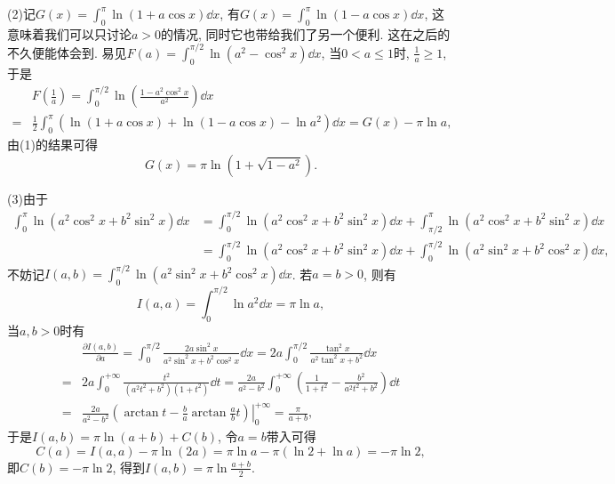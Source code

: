 \begin{quiza}
\begin{solution}
(2)记\(G(x)=\int_{0}^{\pi}\ln\left(1+a\cos x\right)\dd x\), 有\(G(x)=\int_{0}^{\pi}\ln\left(1-a\cos x\right)\dd x\), 这意味着我们可以只讨论\(a>0\)的情况, 同时它也带给我们了另一个便利. 这在之后的不久便能体会到. 易见\(F(a)=\int_{0}^{\pi/2}\ln\left(a^2-\cos^2x\right)\dd x\), 当\(0<a\leqslant 1\)时, \(\frac{1}{a}\geqslant 1\), 于是\[\begin{split}
&F\left(\frac{1}{a}\right)=\int_{0}^{\pi/2}\ln\left(\frac{1-a^2\cos^2x}{a^2}\right)\dd x\\=&\frac{1}{2}\int_{0}^{\pi}\left(\ln(1+a\cos x)+\ln(1-a\cos x)-\ln a^2\right)\dd x=G(x)-\pi \ln a,
\end{split}\]由(1)的结果可得\[G(x)=\pi\ln\left(1+\sqrt{1-a^2}\right).\]

(3)由于\[\begin{split}
\int_{0}^{\pi}\ln(a^2\cos^2x+b^2\sin^2x)\dd x&=\int_{0}^{\pi/2}\ln(a^2\cos^2x+b^2\sin^2x)\dd x+\int_{\pi/2}^{\pi}\ln(a^2\cos^2x+b^2\sin^2x)\dd x\\&=\int_{0}^{\pi/2}\ln(a^2\cos^2x+b^2\sin^2x)\dd x+\int_{0}^{\pi/2}\ln(a^2\sin^2x+b^2\cos^2x)\dd x,
\end{split}\]
不妨记\(I(a,b)=\int_{0}^{\pi/2}\ln(a^2\sin^2x+b^2\cos^2x)\dd x\). 若\(a=b>0\), 则有\[I(a,a)=\int_{0}^{\pi/2}\ln a^2\dd x=\pi\ln a,\]当\(a,b>0\)时有\[\begin{split}
&\frac{\partial I(a,b)}{\partial a}=\int_{0}^{\pi/2}\frac{2a\sin^2x}{a^2\sin^2x+b^2\cos^2x}\dd x=2a\int_{0}^{\pi/2}\frac{\tan^2x}{a^2\tan^2x+b^2}\dd x\\=&2a\int_{0}^{+\infty}\frac{t^2}{(a^2t^2+b^2)(1+t^2)}\dd t=\frac{2a}{a^2-b^2}\int_{0}^{+\infty}\left(\frac{1}{1+t^2}-\frac{b^2}{a^2t^2+b^2}\right)\dd t\\=&\frac{2a}{a^2-b^2}\left.\left(\arctan t-\frac{b}{a}\arctan\frac{a}{b}t\right)\right|^{+\infty}_0=\frac{\pi}{a+b},
\end{split}\]于是\(I(a,b)=\pi\ln(a+b)+C(b)\), 令\(a=b\)带入可得\[C(a)=I(a,a)-\pi\ln\left(2a\right)=\pi\ln a-\pi\left(\ln 2+\ln a\right)=-\pi\ln 2,\]即\(C(b)=-\pi\ln 2\), 得到\(I(a,b)=\pi\ln\frac{a+b}{2}.\)


\end{solution}
\end{quiza}

